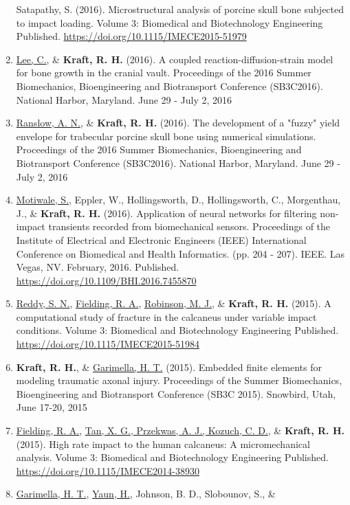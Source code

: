 \documentclass[a4paper,10pt]{article}
\begin{document}
\begin{enumerate}
 Satapathy, S. (2016). Microstructural analysis of porcine skull bone subjected to impact loading. Volume 3: Biomedical and Biotechnology Engineering Published. \url{https://doi.org/10.1115/IMECE2015-51979}
  \item \underline{Lee, C.}, \&
 \textbf{\textbf{Kraft,} R. H.} (2016). A coupled reaction-diffusion-strain model for bone growth in the cranial vault. Proceedings of the 2016 Summer Biomechanics, Bioengineering and Biotransport Conference (SB3C2016).    
National Harbor, Maryland. June 29 - July 2, 2016
  \item \underline{Ranslow, A. N.}, \&
 \textbf{\textbf{Kraft,} R. H.} (2016). The development of a "fuzzy" yield envelope for trabecular porcine skull bone using numerical simulations. Proceedings of the 2016 Summer Biomechanics, Bioengineering and Biotransport Conference (SB3C2016).    
National Harbor, Maryland. June 29 - July 2, 2016
  \item \underline{Motiwale, S.}, Eppler, W., Hollingsworth, D., Hollingsworth, C., Morgenthau, J., \&
 \textbf{\textbf{Kraft,} R. H.} (2016). Application of neural networks for filtering non-impact transients recorded from biomechanical sensors. Proceedings of the Institute of Electrical and Electronic Engineers (IEEE) International Conference on Biomedical and Health Informatics. (pp. 204 - 207). IEEE.  
Las Vegas, NV. February, 2016. Published. \url{https://doi.org/10.1109/BHI.2016.7455870}
  \item \underline{Reddy, S. N.}, \underline{Fielding, R. A.}, \underline{Robinson, M. J.}, \&
 \textbf{\textbf{Kraft,} R. H.} (2015). A computational study of fracture in the calcaneus under variable impact conditions. Volume 3: Biomedical and Biotechnology Engineering Published. \url{https://doi.org/10.1115/IMECE2015-51984}
  \item \textbf{\textbf{Kraft,} R. H.}, \&
 \underline{Garimella, H. T.} (2015). Embedded finite elements for modeling traumatic axonal injury. Proceedings of the Summer Biomechanics, Bioengineering and Biotransport Conference    (SB3C 2015).    
Snowbird, Utah, June 17-20, 2015
  \item \underline{Fielding, R. A.}, \underline{Tan, X. G., Przekwas, A. J., Kozuch, C. D.}, \&
 \textbf{\textbf{Kraft,} R. H.} (2015). High rate impact to the human calcaneus: A micromechanical analysis. Volume 3: Biomedical and Biotechnology Engineering Published. \url{https://doi.org/10.1115/IMECE2014-38930}
  \item \underline{Garimella, H. T.}, \underline{Yaun, H.}, Johnson, B. D., Slobounov, S., \&

\end{enumerate}
\end{document}
